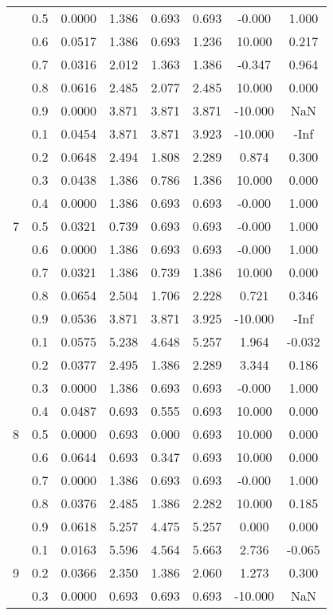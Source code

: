 \documentclass[11pt,a4paper]{report}
\begin{document}
\begin{longtable}{ | c | c || c | c | c | c | c | c | }
 & 0.5 & 0.0000 & 1.386 & 0.693 & 0.693 & -0.000 & 1.000 \\
 & 0.6 & 0.0517 & 1.386 & 0.693 & 1.236 & 10.000 & 0.217 \\
 & 0.7 & 0.0316 & 2.012 & 1.363 & 1.386 & -0.347 & 0.964 \\
 & 0.8 & 0.0616 & 2.485 & 2.077 & 2.485 & 10.000 & 0.000 \\
 & 0.9 & 0.0000 & 3.871 & 3.871 & 3.871 & -10.000 & NaN \\
 \hline
\multirow{9}{*}{7} & 0.1 & 0.0454 & 3.871 & 3.871 & 3.923 & -10.000 & -Inf \\
 & 0.2 & 0.0648 & 2.494 & 1.808 & 2.289 & 0.874 & 0.300 \\
 & 0.3 & 0.0438 & 1.386 & 0.786 & 1.386 & 10.000 & 0.000 \\
 & 0.4 & 0.0000 & 1.386 & 0.693 & 0.693 & -0.000 & 1.000 \\
 & 0.5 & 0.0321 & 0.739 & 0.693 & 0.693 & -0.000 & 1.000 \\
 & 0.6 & 0.0000 & 1.386 & 0.693 & 0.693 & -0.000 & 1.000 \\
 & 0.7 & 0.0321 & 1.386 & 0.739 & 1.386 & 10.000 & 0.000 \\
 & 0.8 & 0.0654 & 2.504 & 1.706 & 2.228 & 0.721 & 0.346 \\
 & 0.9 & 0.0536 & 3.871 & 3.871 & 3.925 & -10.000 & -Inf \\
 \hline
\multirow{9}{*}{8} & 0.1 & 0.0575 & 5.238 & 4.648 & 5.257 & 1.964 & -0.032 \\
 & 0.2 & 0.0377 & 2.495 & 1.386 & 2.289 & 3.344 & 0.186 \\
 & 0.3 & 0.0000 & 1.386 & 0.693 & 0.693 & -0.000 & 1.000 \\
 & 0.4 & 0.0487 & 0.693 & 0.555 & 0.693 & 10.000 & 0.000 \\
 & 0.5 & 0.0000 & 0.693 & 0.000 & 0.693 & 10.000 & 0.000 \\
 & 0.6 & 0.0644 & 0.693 & 0.347 & 0.693 & 10.000 & 0.000 \\
 & 0.7 & 0.0000 & 1.386 & 0.693 & 0.693 & -0.000 & 1.000 \\
 & 0.8 & 0.0376 & 2.485 & 1.386 & 2.282 & 10.000 & 0.185 \\
 & 0.9 & 0.0618 & 5.257 & 4.475 & 5.257 & 0.000 & 0.000 \\
 \hline
\multirow{9}{*}{9} & 0.1 & 0.0163 & 5.596 & 4.564 & 5.663 & 2.736 & -0.065 \\
 & 0.2 & 0.0366 & 2.350 & 1.386 & 2.060 & 1.273 & 0.300 \\
 & 0.3 & 0.0000 & 0.693 & 0.693 & 0.693 & -10.000 & NaN \\

\end{longtable}
\end{document}
